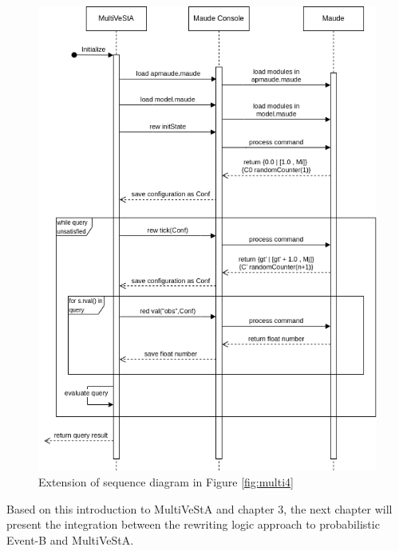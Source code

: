\begin{figure}[H]
    \centering
    \includegraphics[scale = 0.6]{images/multi5.png}
    \caption{Extension of sequence diagram in Figure \ref{fig:multi4}}
    \label{fig:multi5}
\end{figure}

Based on this introduction to MultiVeStA and chapter 3, the next chapter will present the integration between the rewriting logic approach to probabilistic Event-B and MultiVeStA.